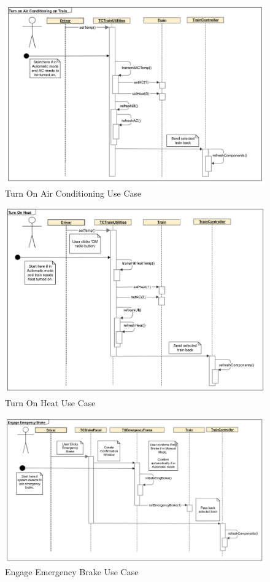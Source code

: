 \documentclass[]{article}
\begin{document}
\begin{figure}[H]
	\centering
	\includegraphics[scale=.3]{tc_turnOnAC_usecase}
	\caption{Turn On Air Conditioning Use Case}
\end{figure}

\begin{figure}[H]
	\centering
	\includegraphics[scale=.3]{tc_turnOnHeat_usecase}
	\caption{Turn On Heat Use Case}
\end{figure}

\begin{figure}[H]
	\centering
	\includegraphics[scale=.3]{tc_emgBrake_usecase}
	\caption{Engage Emergency Brake Use Case}
\end{figure}
\end{document}
